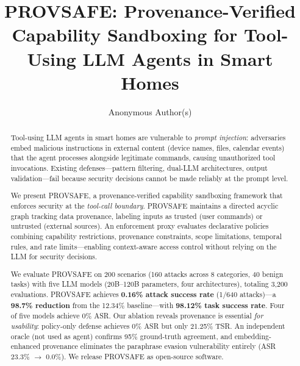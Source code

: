 \documentclass[sigconf,anonymous]{acmart}
\title{PROVSAFE: Provenance-Verified Capability Sandboxing for Tool-Using LLM Agents in Smart Homes}
\author{Anonymous Author(s)}
\affiliation{%
  \institution{Anonymous Institution}
  \country{}
}
\newcommand{\tool}{\textsc{PROVSAFE}}
\newcommand{\sys}{\tool}
\begin{document}
\begin{abstract}
Tool-using LLM agents in smart homes are vulnerable to \emph{prompt injection}: adversaries embed malicious instructions in external content (device names, files, calendar events) that the agent processes alongside legitimate commands, causing unauthorized tool invocations. Existing defenses---pattern filtering, dual-LLM architectures, output validation---fail because security decisions cannot be made reliably at the prompt level.

We present \sys{}, a provenance-verified capability sandboxing framework that enforces security at the \emph{tool-call boundary}. \sys{} maintains a directed acyclic graph tracking data provenance, labeling inputs as trusted (user commands) or untrusted (external sources). An enforcement proxy evaluates declarative policies combining capability restrictions, provenance constraints, scope limitations, temporal rules, and rate limits---enabling context-aware access control without relying on the LLM for security decisions.

We evaluate \sys{} on 200 scenarios (160 attacks across 8 categories, 40 benign tasks) with five LLM models (20B--120B parameters, four architectures), totaling 3,200 evaluations. \sys{} achieves \textbf{0.16\% attack success rate} (1/640 attacks)---a \textbf{98.7\% reduction} from the 12.34\% baseline---with \textbf{98.12\% task success rate}. Four of five models achieve 0\% ASR. Our ablation reveals provenance is essential \emph{for usability}: policy-only defense achieves 0\% ASR but only 21.25\% TSR. An independent oracle (not used as agent) confirms 95\% ground-truth agreement, and embedding-enhanced provenance eliminates the paraphrase evasion vulnerability entirely (ASR 23.3\% $\to$ 0.0\%). We release \sys{} as open-source software.
\end{abstract}


\maketitle
















\appendix
\end{document}
